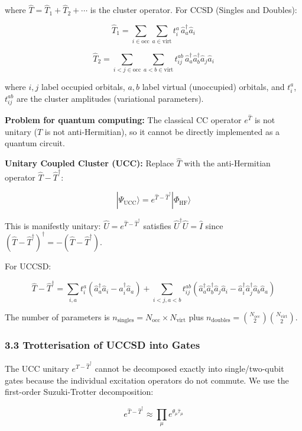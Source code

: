 \documentclass[
  11pt,
]{report}
\begin{document}
where \(\hat{T} = \hat{T}_1 + \hat{T}_2 + \cdots\) is the cluster
operator. For CCSD (Singles and Doubles):

\[\hat{T}_1 = \sum_{i \in \text{occ}} \sum_{a \in \text{virt}} t_i^a\, \hat{a}_a^\dagger \hat{a}_i\]

\[\hat{T}_2 = \sum_{i<j \in \text{occ}} \sum_{a<b \in \text{virt}} t_{ij}^{ab}\, \hat{a}_a^\dagger \hat{a}_b^\dagger \hat{a}_j \hat{a}_i\]

where \(i, j\) label occupied orbitals, \(a, b\) label virtual
(unoccupied) orbitals, and \(t_i^a\), \(t_{ij}^{ab}\) are the cluster
amplitudes (variational parameters).

\textbf{Problem for quantum computing:} The classical CC operator
\(e^{\hat{T}}\) is not unitary (\(\hat{T}\) is not anti-Hermitian), so
it cannot be directly implemented as a quantum circuit.

\textbf{Unitary Coupled Cluster (UCC):} Replace \(\hat{T}\) with the
anti-Hermitian operator \(\hat{T} - \hat{T}^\dagger\):

\[|\Psi_{\text{UCC}}\rangle = e^{\hat{T} - \hat{T}^\dagger}|\Phi_{\text{HF}}\rangle\]

This is manifestly unitary: \(\hat{U} = e^{\hat{T} - \hat{T}^\dagger}\)
satisfies \(\hat{U}^\dagger\hat{U} = \hat{I}\) since
\((\hat{T} - \hat{T}^\dagger)^\dagger = -(\hat{T} - \hat{T}^\dagger)\).

For UCCSD:

\[\hat{T} - \hat{T}^\dagger = \sum_{i,a} t_i^a(\hat{a}_a^\dagger\hat{a}_i - \hat{a}_i^\dagger\hat{a}_a) + \sum_{i<j,a<b} t_{ij}^{ab}(\hat{a}_a^\dagger\hat{a}_b^\dagger\hat{a}_j\hat{a}_i - \hat{a}_i^\dagger\hat{a}_j^\dagger\hat{a}_b\hat{a}_a)\]

The number of parameters is
\(n_{\text{singles}} = N_{\text{occ}} \times N_{\text{virt}}\) plus
\(n_{\text{doubles}} = \binom{N_{\text{occ}}}{2}\binom{N_{\text{virt}}}{2}\).

\subsubsection{3.3 Trotterisation of UCCSD into
Gates}\label{trotterisation-of-uccsd-into-gates}

The UCC unitary \(e^{\hat{T}-\hat{T}^\dagger}\) cannot be decomposed
exactly into single/two-qubit gates because the individual excitation
operators do not commute. We use the first-order Suzuki-Trotter
decomposition:

\[e^{\hat{T}-\hat{T}^\dagger} \approx \prod_{\mu} e^{\theta_\mu \hat{\tau}_\mu}\]
\end{document}
